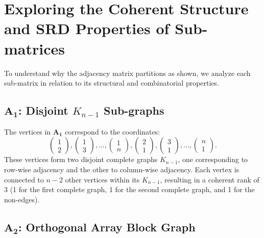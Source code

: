 \documentclass{article}
\begin{document}
\section{Exploring the Coherent Structure and SRD Properties of Sub-matrices}

To understand why the adjacency matrix partitions as shown, we analyze each sub-matrix in relation to its structural and combinatorial properties.

\subsection{\( \mathbf{A_1} \): Disjoint \( K_{n-1} \) Sub-graphs}

The vertices in \( \mathbf{A_1} \) correspond to the coordinates:
\[
\begin{pmatrix} 1 \\ 2 \end{pmatrix}, \begin{pmatrix} 1 \\ 3 \end{pmatrix}, \dots, \begin{pmatrix} 1 \\ n \end{pmatrix}, \begin{pmatrix} 2 \\ 1 \end{pmatrix}, \begin{pmatrix} 3 \\ 1 \end{pmatrix}, \dots, \begin{pmatrix} n \\ 1 \end{pmatrix}.
\]
These vertices form two disjoint complete graphs \( K_{n-1} \), one corresponding to row-wise adjacency and the other to column-wise adjacency. Each vertex is connected to \( n-2 \) other vertices within its \( K_{n-1} \), resulting in a coherent rank of 3 (1 for the first complete graph, 1 for the second complete graph, and 1 for the non-edges).

\subsection{\( \mathbf{A_2} \): Orthogonal Array Block Graph}
\end{document}
